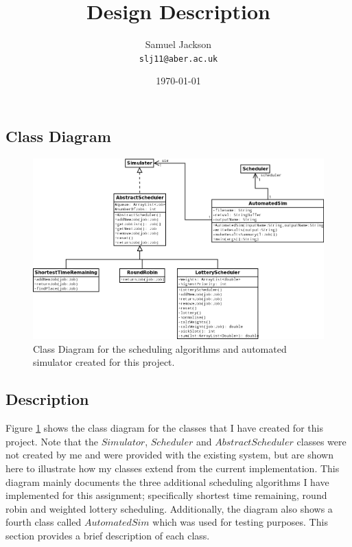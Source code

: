 \documentclass{article}
\begin{document}
\title{Design Description}
\author{Samuel Jackson \\ \texttt{slj11@aber.ac.uk}}
\date{\today}
\maketitle

\newpage
\begin{landscape}
\section{Class Diagram}

\begin{figure}[H]
\centering
\includegraphics[width=1.1\textwidth]{class_diagram.png}
\caption{Class Diagram for the scheduling algorithms and automated simulator created for this project.}
\label{fig:class-diagram}
\end{figure}
\end{landscape}

\subsection{Description}
Figure \ref{fig:class-diagram} shows the class diagram for the classes that I have created for this project. Note that the $Simulator$, $Scheduler$ and $AbstractScheduler$ classes were not created by me and were provided with the existing system, but are shown here to illustrate how my classes extend from the current implementation. This diagram mainly documents the three additional scheduling algorithms I have implemented for this assignment; specifically shortest time remaining, round robin and weighted lottery scheduling. Additionally, the diagram also shows a fourth class called $AutomatedSim$ which was used for testing purposes. This section provides a brief description of each class.
\end{document}
